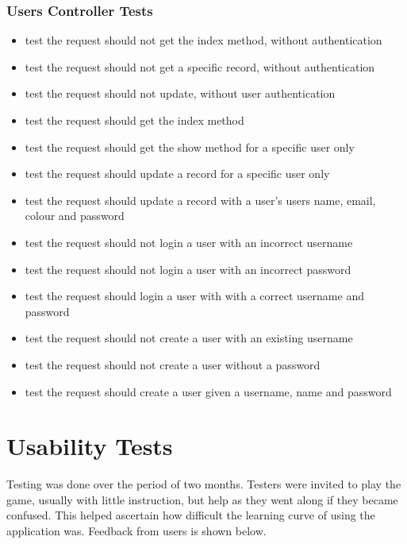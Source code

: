 \subsubsection{Users Controller Tests}
\begin{itemize}
	\item test the request should not get the index method, without authentication
	\item test the request should not get a specific record, without authentication
	\item test the request should not update, without user authentication
	\item test the request should get the index method
	\item test the request should get the show method for a specific user only
	\item test the request should update a record for a specific user only
	\item test the request should update a record with a user's users name, email, colour and password
	\item test the request should not login a user with an incorrect username
	\item test the request should not login a user with an incorrect password
	\item test the request should login a user with with a correct username and password
	\item test the request should not create a user with an existing username
	\item test the request should not create a user without a password
	\item test the request should create a user given a username, name and password
\end{itemize}

\section{Usability Tests}
	Testing was done over the period of two months. Testers were invited to play the game, usually with little instruction, but help as they went along if they became confused. This helped ascertain how difficult the learning curve of using the application was. Feedback from users is shown below.

